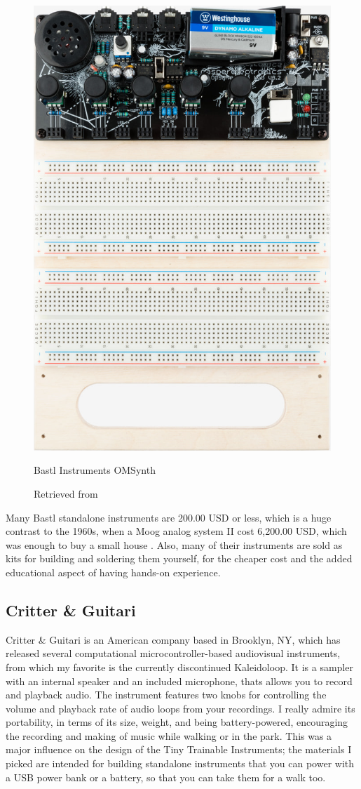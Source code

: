 \begin{figure}[ht]
  \centering
  \includegraphics[width=0.75\linewidth,height=0.25\textheight,keepaspectratio]{images/bastl-omsynth.jpg}
  \caption{Bastl Instruments OMSynth}
  \caption*{Retrieved from \cite{website-bastl-instruments-current}}
  \label{fig:bastl-omsynth}
\end{figure}

Many Bastl standalone instruments are 200.00 USD or less, which is a huge contrast to the 1960s, when a Moog analog system II cost 6,200.00 USD, which was enough to buy a small house \cite{analog-days}. Also, many of their instruments are sold as kits for building and soldering them yourself, for the cheaper cost and the added educational aspect of having hands-on experience.

\subsection{Critter \& Guitari}

Critter \& Guitari is an American company based in Brooklyn, NY, which has released several computational microcontroller-based audiovisual instruments, from which my favorite is the currently discontinued Kaleidoloop. It is a sampler with an internal speaker and an included microphone, thats allows you to record and playback audio. The instrument features two knobs for controlling the volume and playback rate of audio loops from your recordings. I really admire its portability, in terms of its size, weight, and being battery-powered, encouraging the recording and making of music while walking or in the park. This was a major influence on the design of the Tiny Trainable Instruments; the materials I picked are intended for building standalone instruments that you can power with a USB power bank or a battery, so that you can take them for a walk too.

